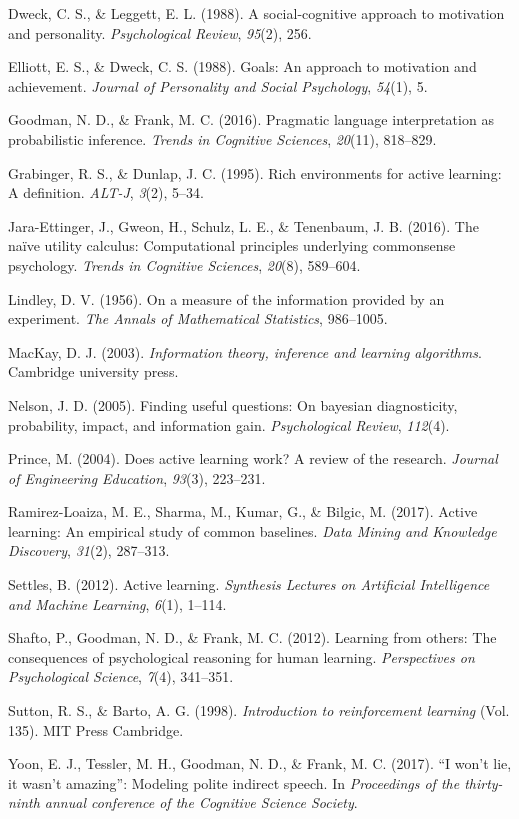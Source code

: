 \documentclass[10pt, letterpaper]{article}
\begin{document}
\hypertarget{ref-dweck1988}{}
Dweck, C. S., \& Leggett, E. L. (1988). A social-cognitive approach to
motivation and personality. \emph{Psychological Review}, \emph{95}(2),
256.

\hypertarget{ref-elliott1988}{}
Elliott, E. S., \& Dweck, C. S. (1988). Goals: An approach to motivation
and achievement. \emph{Journal of Personality and Social Psychology},
\emph{54}(1), 5.

\hypertarget{ref-goodman2016}{}
Goodman, N. D., \& Frank, M. C. (2016). Pragmatic language
interpretation as probabilistic inference. \emph{Trends in Cognitive
Sciences}, \emph{20}(11), 818--829.

\hypertarget{ref-grabinger1995rich}{}
Grabinger, R. S., \& Dunlap, J. C. (1995). Rich environments for active
learning: A definition. \emph{ALT-J}, \emph{3}(2), 5--34.

\hypertarget{ref-jara2016}{}
Jara-Ettinger, J., Gweon, H., Schulz, L. E., \& Tenenbaum, J. B. (2016).
The naïve utility calculus: Computational principles underlying
commonsense psychology. \emph{Trends in Cognitive Sciences},
\emph{20}(8), 589--604.

\hypertarget{ref-lindley1956}{}
Lindley, D. V. (1956). On a measure of the information provided by an
experiment. \emph{The Annals of Mathematical Statistics}, 986--1005.

\hypertarget{ref-mackay2003}{}
MacKay, D. J. (2003). \emph{Information theory, inference and learning
algorithms}. Cambridge university press.

\hypertarget{ref-nelson2005}{}
Nelson, J. D. (2005). Finding useful questions: On bayesian
diagnosticity, probability, impact, and information gain.
\emph{Psychological Review}, \emph{112}(4).

\hypertarget{ref-prince2004does}{}
Prince, M. (2004). Does active learning work? A review of the research.
\emph{Journal of Engineering Education}, \emph{93}(3), 223--231.

\hypertarget{ref-ramirez2017active}{}
Ramirez-Loaiza, M. E., Sharma, M., Kumar, G., \& Bilgic, M. (2017).
Active learning: An empirical study of common baselines. \emph{Data
Mining and Knowledge Discovery}, \emph{31}(2), 287--313.

\hypertarget{ref-settles2012active}{}
Settles, B. (2012). Active learning. \emph{Synthesis Lectures on
Artificial Intelligence and Machine Learning}, \emph{6}(1), 1--114.

\hypertarget{ref-shafto2012learning}{}
Shafto, P., Goodman, N. D., \& Frank, M. C. (2012). Learning from
others: The consequences of psychological reasoning for human learning.
\emph{Perspectives on Psychological Science}, \emph{7}(4), 341--351.

\hypertarget{ref-sutton1998}{}
Sutton, R. S., \& Barto, A. G. (1998). \emph{Introduction to
reinforcement learning} (Vol. 135). MIT Press Cambridge.

\hypertarget{ref-yoon2017}{}
Yoon, E. J., Tessler, M. H., Goodman, N. D., \& Frank, M. C. (2017). ``I
won't lie, it wasn't amazing'': Modeling polite indirect speech. In
\emph{Proceedings of the thirty-ninth annual conference of the Cognitive
Science Society}.
\end{document}
